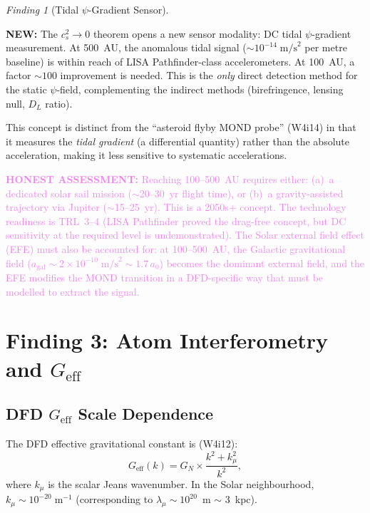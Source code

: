 \documentclass[11pt]{article}
\theoremstyle{definition}
\theoremstyle{remark}
\newtheorem{finding}[theorem]{Finding}
\newcommand{\ee}[1]{\times10^{#1}}
\newcommand{\Geff}{G_{\mathrm{eff}}}
\newcommand{\honest}[1]{\textcolor{violet}{\textbf{HONEST ASSESSMENT:} #1}}
\newcommand{\newresult}[1]{\textcolor{green!50!black}{\textbf{NEW:} #1}}
\begin{document}
\begin{finding}[Tidal $\psi$-Gradient Sensor]
\label{find:tidal}
\newresult{The $c_s^2 \to 0$ theorem opens a new sensor
modality: DC tidal $\psi$-gradient measurement.  At 500~AU,
the anomalous tidal signal ($\sim 10^{-14}\;\mathrm{m/s}^2$ per
metre baseline) is within reach of LISA Pathfinder-class
accelerometers.  At 100~AU, a factor $\sim 100$ improvement
is needed.  This is the \emph{only} direct detection method
for the static $\psi$-field, complementing the indirect
methods (birefringence, lensing null, $D_L$ ratio).

This concept is distinct from the ``asteroid flyby MOND probe''
(W4i14) in that it measures the \emph{tidal gradient} (a
differential quantity) rather than the absolute acceleration,
making it less sensitive to systematic accelerations.}

\honest{Reaching 100--500~AU requires either: (a)~a dedicated
solar sail mission ($\sim$20--30~yr flight time), or
(b)~a gravity-assisted trajectory via Jupiter ($\sim$15--25~yr).
This is a 2050s+ concept.  The technology readiness is TRL~3--4
(LISA Pathfinder proved the drag-free concept, but DC
sensitivity at the required level is undemonstrated).
The Solar external field effect (EFE) must also be accounted
for: at 100--500~AU, the Galactic gravitational field
($a_{\mathrm{gal}} \sim 2\ee{-10}\;\mathrm{m/s}^2 \sim 1.7\,a_0$)
becomes the dominant external field, and the EFE modifies
the MOND transition in a DFD-specific way that must be
modelled to extract the signal.}
\end{finding}

\section{Finding 3: Atom Interferometry and $\Geff$}
\label{sec:atominterf}

\subsection{DFD $\Geff$ Scale Dependence}

The DFD effective gravitational constant is (W4i12):
\begin{equation}
\Geff(k) = G_N \times \frac{k^2 + k_\mu^2}{k^2},
\label{eq:Geff}
\end{equation}
where $k_\mu$ is the scalar Jeans wavenumber.  In the Solar
neighbourhood, $k_\mu \sim 10^{-20}\;\mathrm{m}^{-1}$
(corresponding to $\lambda_\mu \sim 10^{20}$~m $\sim$ 3~kpc).
\end{document}
